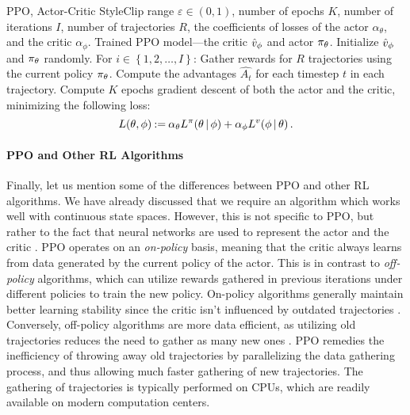 \begin{algor}{\label{alg:ppo}PPO, Actor-Critic Style}{Clip range $ \varepsilon \in \left( 0,1 \right) $, number of epochs $ K $, number of iterations $ I $, number of trajectories $ R $, the coefficients of losses of the actor $ \alpha_\theta $, and the critic $ \alpha_\phi $.}
	{Trained PPO model---the critic $ \hat{v}_{\phi} $ and actor $ \pi_{\theta} $.}
	\State Initialize $ \hat{v}_{\phi} $ and $ \pi_{\theta} $ randomly.
	\Indent For $ i \in \left\{ 1,2,\ldots,I \right\} $:
		\State Gather rewards for $ R $ trajectories using the current policy $ \pi_{\theta} $.
		\State Compute the advantages $ \hat{A_t} $ for each timestep $ t $ in each trajectory.
		\State Compute $ K $ epochs gradient descent of both the actor and the critic, minimizing the following loss: \[
			L\!\left(\theta, \phi\right) \mathbin{:=} \alpha_\theta L^\pi\!\left(\theta \,|\, \phi\right) + \alpha_\phi L^v\!\left(\phi \,|\, \theta\right).
		\]
	\EndIndent
\end{algor}

\paragraph{PPO and Other RL Algorithms}
Finally, let us mention some of the differences between PPO and other RL algorithms.
We have already discussed that we require an algorithm which works well with continuous state spaces.
However, this is not specific to PPO, but rather to the fact that neural networks are used to represent the actor and the critic \citep{journals/nature/MnihKSRVBGRFOPB15}.
PPO operates on an \emph{on-policy} basis, meaning that the critic always learns from data generated by the current policy of the actor.
This is in contrast to \emph{off-policy} algorithms, which can utilize rewards gathered in previous iterations under different policies to train the new policy.
On-policy algorithms generally maintain better learning stability since the critic isn't influenced by outdated trajectories \citep{hausknecht2016policy}.
Conversely, off-policy algorithms are more data efficient, as utilizing old trajectories reduces the need to gather as many new ones \citep{LYU2024120371}.
PPO remedies the inefficiency of throwing away old trajectories by parallelizing the data gathering process, and thus allowing much faster gathering of new trajectories.
The gathering of trajectories is typically performed on CPUs, which are readily available on modern computation centers.

